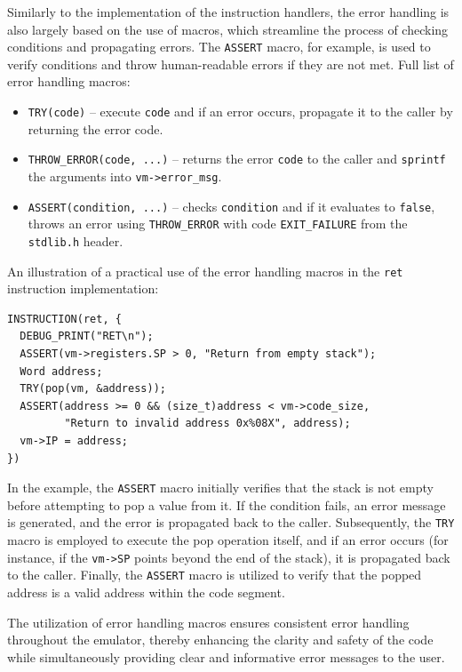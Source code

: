 \documentclass[12pt,a4paper,final]{article}
\newcommand{\code}[1]{\texttt{#1}}
\begin{document}
Similarly to the implementation of the instruction handlers, the error handling
is also largely based on the use of macros, which streamline the process of
checking conditions and propagating errors. The \code{ASSERT} macro, for
example, is used to verify conditions and throw human-readable errors if they
are not met. Full list of error handling macros:

\begin{itemize}
\item \code{TRY(code)} -- execute \code{code} and if an error occurs, propagate
    it to the caller by returning the error code.
\item \code{THROW_ERROR(code, ...)} -- returns the error \code{code} to the
    caller and \code{sprintf} the arguments into \code{vm->error_msg}.
\item \code{ASSERT(condition, ...)} -- checks \code{condition} and if it
    evaluates to \code{false}, throws an error using \code{THROW_ERROR} with
    code \code{EXIT_FAILURE} from the \code{stdlib.h} header.
\end{itemize}

An illustration of a practical use of the error handling macros in the
\code{ret} instruction implementation:

\begin{verbatim}
INSTRUCTION(ret, {
  DEBUG_PRINT("RET\n");
  ASSERT(vm->registers.SP > 0, "Return from empty stack");
  Word address;
  TRY(pop(vm, &address));
  ASSERT(address >= 0 && (size_t)address < vm->code_size,
         "Return to invalid address 0x%08X", address);
  vm->IP = address;
})
\end{verbatim}

In the example, the \code{ASSERT} macro initially verifies that the stack is not
empty before attempting to pop a value from it. If the condition fails, an error
message is generated, and the error is propagated back to the caller.
Subsequently, the \code{TRY} macro is employed to execute the pop operation
itself, and if an error occurs (for instance, if the \code{vm->SP} points beyond
the end of the stack), it is propagated back to the caller. Finally, the
\code{ASSERT} macro is utilized to verify that the popped address is a valid
address within the code segment.

The utilization of error handling macros ensures consistent error handling
throughout the emulator, thereby enhancing the clarity and safety of the code
while simultaneously providing clear and informative error messages to the user.
\end{document}
